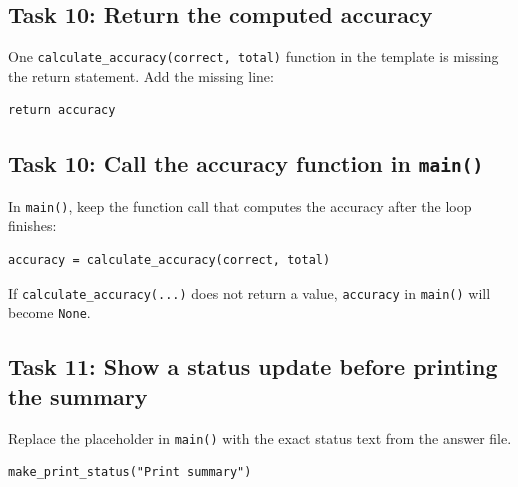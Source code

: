 \subsection{Task 10: Return the computed accuracy}

\begin{tcolorbox}[title=Task 10: Compute the overall accuracy]
One \texttt{calculate\_accuracy(correct, total)} function in the template is missing the return statement. Add the missing line:
\end{tcolorbox}

\begin{verbatim}
return accuracy
\end{verbatim}

\subsection{Task 10: Call the accuracy function in \texttt{main()}}

\begin{tcolorbox}[title=Task 10: Calculate accuracy]
In \texttt{main()}, keep the function call that computes the accuracy after the loop finishes:
\end{tcolorbox}

\begin{verbatim}
accuracy = calculate_accuracy(correct, total)
\end{verbatim}

\begin{tcolorbox}[title=Checkpoint]
If \texttt{calculate\_accuracy(...)} does not return a value, \texttt{accuracy} in \texttt{main()} will become \texttt{None}.
\end{tcolorbox}

\subsection{Task 11: Show a status update before printing the summary}

\begin{tcolorbox}[title=Task 11: Show a status update before printing the summary]
Replace the placeholder in \texttt{main()} with the exact status text from the answer file.
\end{tcolorbox}

\begin{verbatim}
make_print_status("Print summary")
\end{verbatim}

